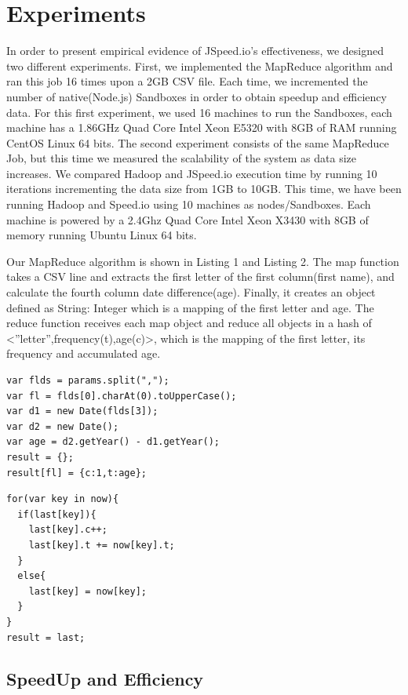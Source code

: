 \documentclass[10pt,reprint]{socc14}
\begin{document}
\section{Experiments}

In order to present empirical evidence of JSpeed.io’s effectiveness, we designed two different experiments. First, we implemented the MapReduce algorithm and ran this job 16 times upon a 2GB CSV file. Each time, we incremented the number of native(Node.js) Sandboxes in order to obtain speedup and efficiency data. For this first experiment, we used 16 machines to run the Sandboxes, each machine has a 1.86GHz Quad Core Intel Xeon E5320  with 8GB of RAM  running CentOS Linux 64 bits. The second experiment consists of the same MapReduce Job, but this time we measured the scalability of the system as data size increases. We compared Hadoop and JSpeed.io execution time by running 10 iterations incrementing the data size from 1GB to 10GB. This time, we have been running Hadoop and Speed.io using 10 machines as nodes/Sandboxes. Each machine is powered by a 2.4Ghz Quad Core Intel Xeon X3430 with 8GB of memory running Ubuntu Linux 64 bits.

Our MapReduce algorithm is shown in Listing 1 and Listing 2. The map function takes a CSV line and extracts the first letter of the first column(first name), and calculate the fourth column  date difference(age). Finally, it creates an object defined as {String: Integer} which is a mapping of the first letter and age. The reduce function receives each map object and reduce all objects in a hash of <”letter”,{frequency(t),age(c)}>, which is the mapping of the first letter, its frequency and accumulated age.


\begin{lstlisting}[label=Map, captionpos=b, caption=Job's map function code]
var flds = params.split(",");
var fl = flds[0].charAt(0).toUpperCase();
var d1 = new Date(flds[3]);
var d2 = new Date();
var age = d2.getYear() - d1.getYear();
result = {};
result[fl] = {c:1,t:age};
\end{lstlisting}



\begin{lstlisting}[label=Reduce, captionpos=b, caption=Job's reduce function code]
for(var key in now){
  if(last[key]){
    last[key].c++;
    last[key].t += now[key].t;
  }
  else{
    last[key] = now[key];
  }
}
result = last;
\end{lstlisting}


\subsection{SpeedUp and Efficiency}
\end{document}
